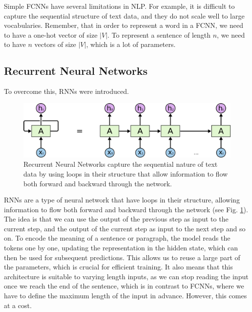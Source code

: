 Simple FCNNs have several limitations in NLP.
For example, it is difficult to capture the sequential structure of text data, and they do not scale well to large vocabularies.
Remember, that in order to represent a word in a FCNN, we need to have a one-hot vector of size $|V|$.
To represent a sentence of length $n$, we need to have $n$ vectors of size $|V|$, which is a lot of parameters.

\subsection{Recurrent Neural Networks}
To overcome this, RNNs were introduced.
\begin{figure}[h]
    \includegraphics[width=\linewidth]{chapters/NLP/figures/rnn.png}
    \caption{Recurrent Neural Networks capture the sequential nature of text data by using loops in their structure that allow information to flow both forward and backward through the network.}
    \label{fig:rnn}
\end{figure}
RNNs are a type of neural network that have loops in their structure, allowing information to flow both forward and backward through the network (see Fig. \ref{fig:rnn}).
The idea is that we can use the output of the previous step as input to the current step, and the output of the current step as input to the next step and so on.
To encode the meaning of a sentence or paragraph, the model reads the tokens one by one, updating the representation in the hidden state, which can then be used for subsequent predictions.
This allows us to reuse a large part of the parameters, which is crucial for efficient training.
It also means that this architecture is suitable to varying length inputs, as we can stop reading the input once we reach the end of the sentence, which is in contrast to FCNNs, where we have to define the maximum length of the input in advance.
However, this comes at a cost.

